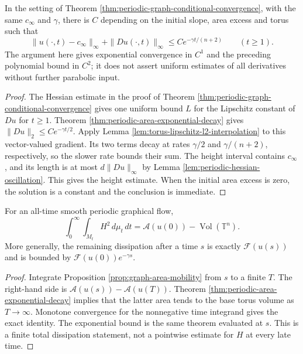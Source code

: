 \begin{corollary}\label{cor:periodic-graph-exponential-c1}
In the setting of Theorem \ref{thm:periodic-graph-conditional-convergence}, with the same $c_\infty$ and $\gamma$, there is $C$ depending on the initial slope, area excess and torus such that
\[
 \|u(\cdot,t)-c_\infty\|_\infty+\|Du(\cdot,t)\|_\infty
 \leq C e^{-\gamma t/(n+2)}\qquad(t\geq1).
\]
The argument here gives exponential convergence in $C^1$ and the preceding polynomial bound in $C^2$; it does not assert uniform estimates of all derivatives without further parabolic input.
\end{corollary}
\begin{proof}
The Hessian estimate in the proof of Theorem \ref{thm:periodic-graph-conditional-convergence} gives one uniform bound $L$ for the Lipschitz constant of $Du$ for $t\geq1$. Theorem \ref{thm:periodic-area-exponential-decay} gives $\|Du\|_2\leq C e^{-\gamma t/2}$. Apply Lemma \ref{lem:torus-lipschitz-l2-interpolation} to this vector-valued gradient. Its two terms decay at rates $\gamma/2$ and $\gamma/(n+2)$, respectively, so the slower rate bounds their sum. The height interval contains $c_\infty$, and its length is at most $d\|Du\|_\infty$ by Lemma \ref{lem:periodic-hessian-oscillation}. This gives the height estimate. When the initial area excess is zero, the solution is a constant and the conclusion is immediate.
\end{proof}

\begin{corollary}\label{cor:periodic-total-area-dissipation}
For an all-time smooth periodic graphical flow,
\[
 \int_0^\infty\int_{M_t}H^2\,d\mu_t\,dt
       =\mathcal A(u(0))-\operatorname{Vol}(\mathbb T^n).
\]
More generally, the remaining dissipation after a time $s$ is exactly $\mathcal F(u(s))$ and is bounded by $\mathcal F(u(0))e^{-\gamma s}$.
\end{corollary}
\begin{proof}
Integrate Proposition \ref{prop:graph-area-mobility} from $s$ to a finite $T$. The right-hand side is $\mathcal A(u(s))-\mathcal A(u(T))$. Theorem \ref{thm:periodic-area-exponential-decay} implies that the latter area tends to the base torus volume as $T\to\infty$. Monotone convergence for the nonnegative time integrand gives the exact identity. The exponential bound is the same theorem evaluated at $s$. This is a finite total dissipation statement, not a pointwise estimate for $H$ at every late time.
\end{proof}
